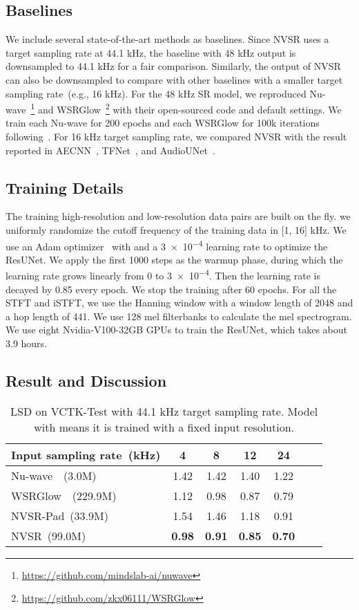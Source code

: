 \documentclass[a4paper]{article}
\begin{document}
\subsection{Baselines}
We include several state-of-the-art methods as baselines. Since NVSR uses a target sampling rate at 44.1 kHz, the baseline with 48 kHz output is downsampled to 44.1 kHz for a fair comparison. Similarly, the output of NVSR can also be downsampled to compare with other baselines with a smaller target sampling rate~(e.g., 16 kHz). For the 48 kHz SR model, we reproduced Nu-wave~\footnote{\url{https://github.com/mindslab-ai/nuwave}} and WSRGlow~\footnote{\url{https://github.com/zkx06111/WSRGlow}} with their open-sourced code and default settings. We train each Nu-wave for \num{200} epochs and each WSRGlow for 100k iterations following~\cite{zhang2021wsrglow}. For \num{16} kHz target sampling rate, we compared NVSR with the result reported in AECNN~\cite{heming-towards-sr-wang2021towards}, TFNet~\cite{tf-network-sr-lim2018time}, and AudioUNet~\cite{audio-supre-resolution-SR-kuleshov2017audio}.

\subsection{Training Details}
The training high-resolution and low-resolution data pairs are built on the fly. we uniformly randomize the cutoff frequency  of the training data in [\num{1}, \num{16}] kHz. We use an Adam optimizer~\cite{kingma2014adam} with  and a \num{3e-4} learning rate to optimize the ResUNet. We apply the first \num{1000} steps as the warmup phase, during which the learning rate grows linearly from \num{0} to \num{3e-4}. Then the learning rate is decayed by \num{0.85} every epoch. We stop the training after \num{60} epochs. For all the STFT and iSTFT, we use the Hanning window with a window length of \num{2048} and a hop length of \num{441}. We use \num{128} mel filterbanks to calculate the mel spectrogram. We use eight Nvidia-V100-32GB GPUs to train the ResUNet, which takes about \num{3.9} hours.

\subsection{Result and Discussion}
\label{sec:result}
\begin{table}[tbp]
\centering
\caption{LSD on VCTK-Test with 44.1 kHz target sampling rate. Model with  means it is trained with a fixed input resolution.}
\label{tab:48k}
\begin{tabular}{@{}lcccccl@{}}
\toprule
Input sampling rate~(kHz)   & 4 & 8 & 12 & 24  \\ \midrule
Nu-wave~\cite{nu-wave-lee2021nu}~(3.0M) &  1.42  &  1.42  &  1.40 & 1.22     \\
WSRGlow~\cite{zhang2021wsrglow}~(229.9M) & 1.12  & 0.98 & 0.87  & 0.79    \\
NVSR-Pad~(33.9M)    & 1.54 & 1.46 & 1.18 & 0.91    \\
NVSR~(99.0M)    & \textbf{0.98} & \textbf{0.91} & \textbf{0.85} & \textbf{0.70}    \\ \bottomrule
\end{tabular}
\end{table}
\end{document}
